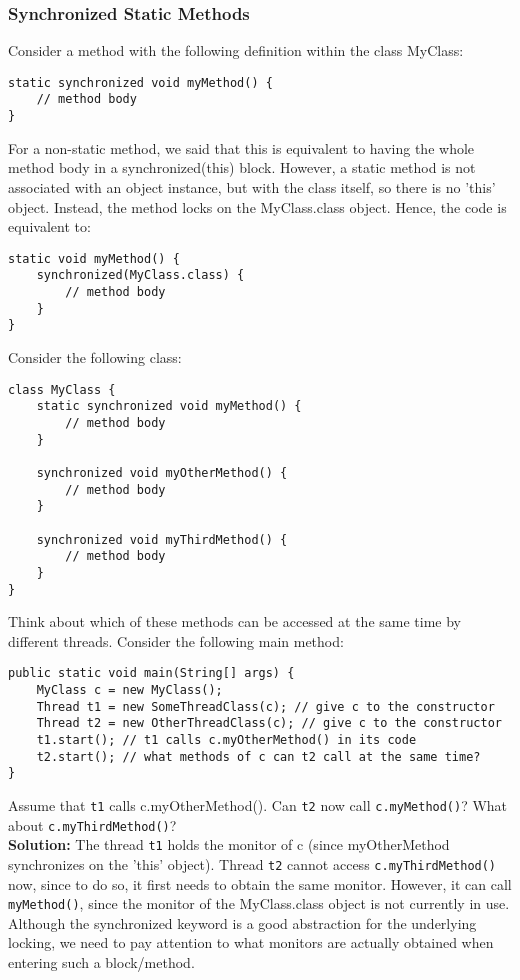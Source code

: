 \documentclass[main.tex]{subfiles}
\begin{document}
\subsubsection{Synchronized Static Methods}
Consider a method with the following definition within the class MyClass:
\begin{verbatim}
static synchronized void myMethod() {
    // method body
}
\end{verbatim}
For a non-static method, we said that this is equivalent to having the whole method body in a synchronized(this) block. However, a static method is not associated with an object instance, but with the class itself, so there is no 'this' object. Instead, the method locks on the MyClass.class object. Hence, the code is equivalent to:
\begin{verbatim}
static void myMethod() {
    synchronized(MyClass.class) {
        // method body
    }
}
\end{verbatim}
Consider the following class:
\begin{verbatim}
class MyClass {
    static synchronized void myMethod() {
        // method body
    }

    synchronized void myOtherMethod() {
        // method body
    }

    synchronized void myThirdMethod() {
        // method body
    }
}
\end{verbatim}
Think about which of these methods can be accessed at the same time by different threads. Consider the following main method:
\begin{verbatim}
public static void main(String[] args) {
    MyClass c = new MyClass();
    Thread t1 = new SomeThreadClass(c); // give c to the constructor
    Thread t2 = new OtherThreadClass(c); // give c to the constructor
    t1.start(); // t1 calls c.myOtherMethod() in its code
    t2.start(); // what methods of c can t2 call at the same time?
}
\end{verbatim}
Assume that \texttt{t1} calls c.myOtherMethod(). Can \texttt{t2} now call \texttt{c.myMethod()}? What about \texttt{c.myThirdMethod()}?\\[3mm]
\textbf{Solution:} The thread \texttt{t1} holds the monitor of c (since myOtherMethod synchronizes on the 'this' object). Thread \texttt{t2} cannot access \texttt{c.myThirdMethod()} now, since to do so, it first needs to obtain the same monitor. However, it can call \texttt{myMethod()}, since the monitor of the MyClass.class object is not currently in use.\\[3mm]
Although the synchronized keyword is a good abstraction for the underlying locking, we need to pay attention to what monitors are actually obtained when entering such a block/method.
\end{document}
